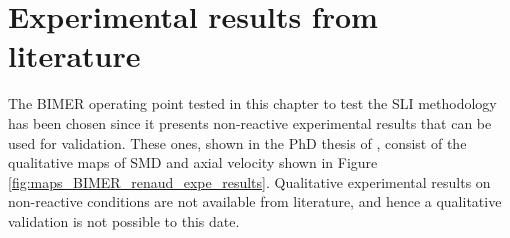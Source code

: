 




\section{Experimental results from literature}
\label{ch9:sec_expe_results_LGS_BIMER}

The BIMER operating point tested in this chapter to test the SLI methodology has been chosen since it presents non-reactive experimental results that can be used for validation. These ones, shown in the PhD thesis of , consist of the qualitative maps of SMD and axial velocity shown in Figure \ref{fig:maps_BIMER_renaud_expe_results}. Qualitative experimental results on non-reactive conditions are not available from literature, and hence a qualitative validation is not possible to this date.

